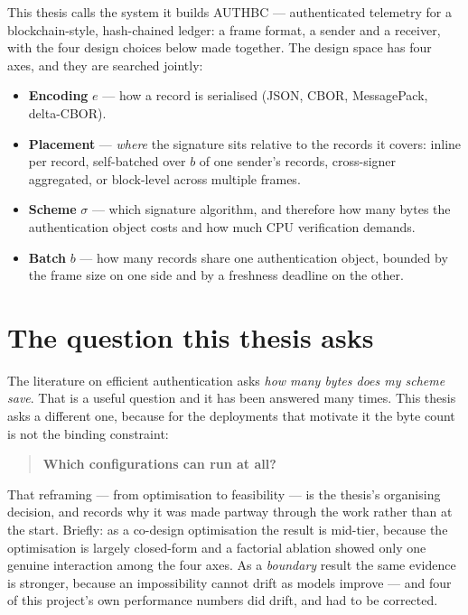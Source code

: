 This thesis calls the system it builds AUTHBC --- authenticated telemetry for a
blockchain-style, hash-chained ledger: a frame format, a sender and a receiver, with the four
design choices below made together. The design space has four axes, and they are searched jointly:

\begin{itemize}
\item \textbf{Encoding} $e$ --- how a record is serialised (JSON, CBOR, MessagePack, delta-CBOR).
\item \textbf{Placement} --- \emph{where} the signature sits relative to the records it covers:
      inline per record, self-batched over $b$ of one sender's records, cross-signer aggregated,
      or block-level across multiple frames.
\item \textbf{Scheme} $\sigma$ --- which signature algorithm, and therefore how many bytes the
      authentication object costs and how much CPU verification demands.
\item \textbf{Batch} $b$ --- how many records share one authentication object, bounded by the
      frame size on one side and by a freshness deadline on the other.
\end{itemize}

\section{The question this thesis asks}

The literature on efficient authentication asks \emph{how many bytes does my scheme save}. That is
a useful question and it has been answered many times. This thesis asks a different one, because
for the deployments that motivate it the byte count is not the binding constraint:

\begin{quote}
\textbf{Which configurations can run at all?}
\end{quote}

That reframing --- from optimisation to feasibility --- is the thesis's organising decision, and
 records why it was made partway through the work rather than at the
start. Briefly: as a co-design optimisation the result is mid-tier, because the optimisation is
largely closed-form and a factorial ablation showed only one genuine interaction among the four
axes. As a \emph{boundary} result the same evidence is stronger, because an impossibility cannot
drift as models improve --- and four of this project's own performance numbers did drift, and had
to be corrected.

